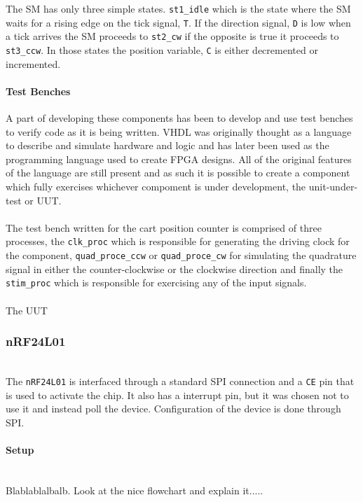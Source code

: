The SM has only three simple states.
\texttt{st1\_idle} which is the state where the SM waits for a rising edge on the tick signal, \texttt{T}.
If the direction signal, \texttt{D} is low when a tick arrives the SM proceeds to \texttt{st2\_cw} if the opposite is true it proceeds to \texttt{st3\_ccw}.
In those states the position variable, \texttt{C} is either decremented or incremented.

\paragraph{Test Benches} %
\label{par:test_benches}
A part of developing these components has been to develop and use test benches to verify code as it is being written.
VHDL was originally thought as a language to describe and simulate hardware and logic and has later been used as the programming language used to create FPGA designs.
All of the original features of the language are still present and as such it is possible to create a component which fully exercises whichever compoment is under development, the unit-under-test or UUT.
\\~\\
The test bench written for the cart position counter is comprised of three processes, the \texttt{clk\_proc} which is responsible for generating the driving clock for the component, \texttt{quad\_proce\_ccw} or \texttt{quad\_proce\_cw} for simulating the quadrature signal in either the counter-clockwise or the clockwise direction and finally the \texttt{stim\_proc} which is responsible for exercising any of the input signals.
\\~\\
The UUT

\subsubsection{nRF24L01} %
\label{ssubs:nrf24l01}
~\\
The \texttt{nRF24L01} is interfaced through a standard SPI connection and a \texttt{CE} pin that is used to activate the chip. 
It also has a interrupt pin, but it was chosen not to use it and instead poll the device. 
Configuration of the device is done through SPI.

\paragraph{Setup} %
\label{par:setup}
~\\
Blablablalbalb.
Look at the nice flowchart and explain it.....

